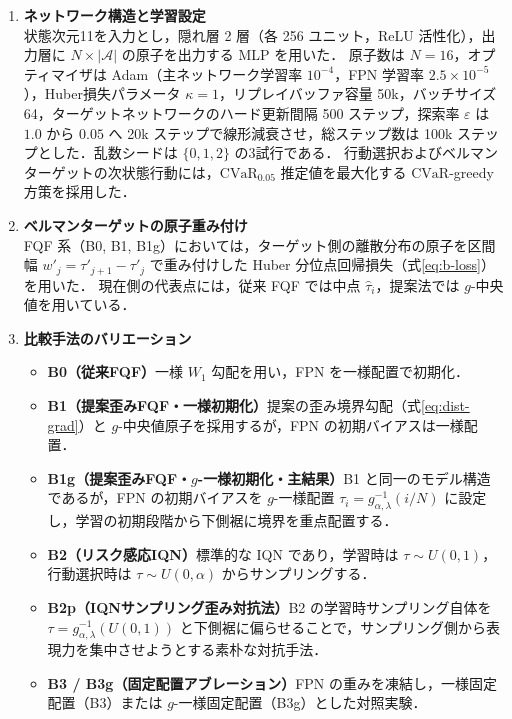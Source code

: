 \documentclass[a4paper,10pt]{jsarticle}
\theoremstyle{definition}
\newcommand{\CVaR}{\mathrm{CVaR}}
\newcommand{\Wone}{W_1}
\begin{document}
\begin{enumerate}
  \item \textbf{ネットワーク構造と学習設定}\\
  状態次元11を入力とし，隠れ層 2 層（各 256 ユニット，ReLU 活性化），出力層に $N \times |\mathcal{A}|$ の原子を出力する MLP を用いた．
  原子数は $N=16$，オプティマイザは Adam（主ネットワーク学習率 $10^{-4}$，FPN 学習率 $2.5 \times 10^{-5}$），Huber損失パラメータ $\kappa=1$，リプレイバッファ容量 50k，バッチサイズ 64，ターゲットネットワークのハード更新間隔 500 ステップ，探索率 $\varepsilon$ は $1.0$ から $0.05$ へ 20k ステップで線形減衰させ，総ステップ数は 100k ステップとした．乱数シードは $\{0, 1, 2\}$ の3試行である．
  行動選択およびベルマンターゲットの次状態行動には，$\CVaR_{0.05}$ 推定値を最大化する $\CVaR$-greedy 方策を採用した．

  \item \textbf{ベルマンターゲットの原子重み付け}\\
  FQF 系（B0, B1, B1g）においては，ターゲット側の離散分布の原子を区間幅 $w'_j = \tau'_{j+1} - \tau'_j$ で重み付けした Huber 分位点回帰損失（式\eqref{eq:b-loss}）を用いた．
  現在側の代表点には，従来 FQF では中点 $\hat\tau_i$，提案法では $g$-中央値を用いている．

  \item \textbf{比較手法のバリエーション}\\
  \begin{itemize}
    \item \textbf{B0（従来FQF）}\quad 一様 $\Wone$ 勾配を用い，FPN を一様配置で初期化．
    \item \textbf{B1（提案歪みFQF・一様初期化）}\quad 提案の歪み境界勾配（式\eqref{eq:dist-grad}）と $g$-中央値原子を採用するが，FPN の初期バイアスは一様配置．
    \item \textbf{B1g（提案歪みFQF・$g$-一様初期化・主結果）}\quad B1 と同一のモデル構造であるが，FPN の初期バイアスを $g$-一様配置 $\tau_i = g^{-1}_{\alpha,\lambda}(i/N)$ に設定し，学習の初期段階から下側裾に境界を重点配置する．
    \item \textbf{B2（リスク感応IQN）}\quad 標準的な IQN であり，学習時は $\tau \sim U(0, 1)$，行動選択時は $\tau \sim U(0, \alpha)$ からサンプリングする．
    \item \textbf{B2p（IQNサンプリング歪み対抗法）}\quad B2 の学習時サンプリング自体を $\tau = g^{-1}_{\alpha,\lambda}(U(0, 1))$ と下側裾に偏らせることで，サンプリング側から表現力を集中させようとする素朴な対抗手法．
    \item \textbf{B3 / B3g（固定配置アブレーション）}\quad FPN の重みを凍結し，一様固定配置（B3）または $g$-一様固定配置（B3g）とした対照実験．
  \end{itemize}


\end{enumerate}
\end{document}
